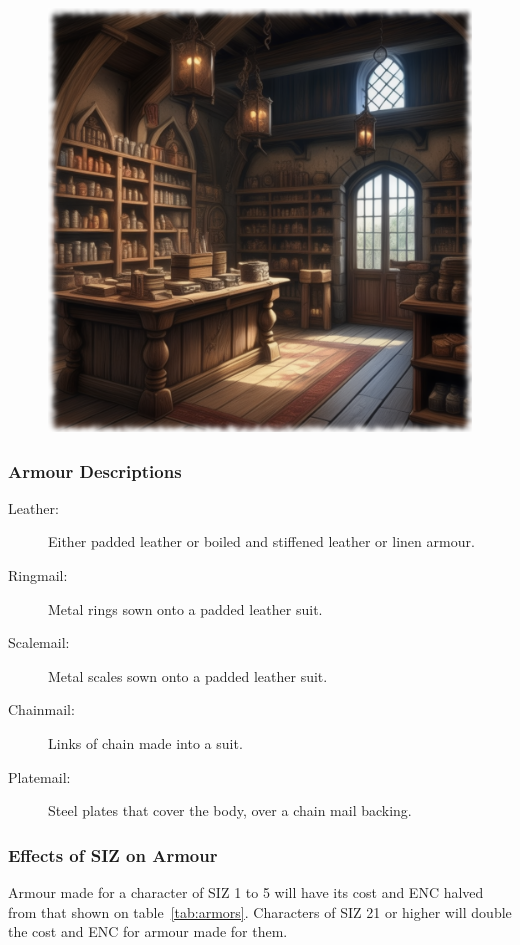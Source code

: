 \begin{figure}[h]
\begin{center}
\includegraphics[scale=0.24]{img/ai-images/shop-interior.png}
\end{center}
\end{figure}

\subsubsection{Armour Descriptions}
\begin{description}
	\item[Leather:] Either padded leather or boiled and stiffened leather or linen armour.
	\item[Ringmail:] Metal rings sown onto a padded leather suit.
	\item[Scalemail:] Metal scales sown onto a padded leather suit.
	\item[Chainmail:] Links of chain made into a suit.
	\item[Platemail:] Steel plates that cover the body, over a chain mail backing.
\end{description}


\subsubsection{Effects of SIZ on Armour}
Armour made for a character of SIZ 1 to 5 will have its cost and ENC halved from that shown on table~\ref{tab:armors}. Characters of SIZ 21 or higher will double the cost and ENC for armour made for them.

